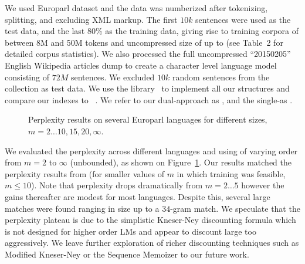 
We used Europarl dataset and the data was numberized after tokenizing, 
splitting, and excluding XML markup. The first $10k$ sentences were used as 
the test data, and the last 80\% as the training data, giving rise to
training corpora of between 8M and 50M tokens and uncompressed size of
up to  (see \supp Table~2 for detailed corpus statistics). 
We also processed 
the full  uncompressed ``20150205'' English Wikipedia articles dump to 
create a character level language model consisting of $72M$ sentences. We
excluded $10k$ random sentences from the collection as test data.
We use the {} library~\cite{gbmp2014sea} to implement all our 
structures and compare our indexes to \SRILM~\cite{stolcke2002srilm}. We
refer to our dual-\CST approach as \dualCST, and the single-\CST as \singleCST.

\begin{figure}[tb]

\caption{Perplexity results on several Europarl languages for different \ngram sizes, $m=2\ldots10,15,20,\infty$.}
\label{fig:pplx}
\end{figure}

We evaluated the perplexity across different languages and using \ngrams of varying order from $m=2$ to $\infty$ (unbounded), as shown on Figure~\ref{fig:pplx}.
Our results matched the perplexity results from \SRILM (for smaller values of $m$ in which \SRILM training was feasible, $m \le 10$).
Note that perplexity drops dramatically from $m=2\ldots5$ however the gains thereafter are modest for most languages.
Despite this, several large \ngram matches were found
ranging in size up to a $34$-gram match.
We speculate that the perplexity plateau is due to the simplistic Kneser-Ney discounting formula which is not designed for higher order \ngram LMs and appear to discount large \ngrams too aggressively. 
We leave further exploration of richer discounting techniques such as Modified Kneser-Ney \cite{chen1996empirical} or the Sequence Memoizer \cite{wood2011sequence} to our future work.





